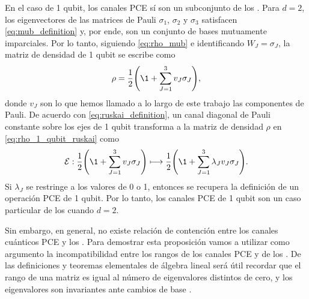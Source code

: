 En el caso de 1 qubit, los canales PCE sí son un subconjunto de los \ruskai{}. Para $d=2$,
los eigenvectores de las matrices de Pauli $\sigma_1$, $\sigma_2$ y $\sigma_3$ 
satisfacen \eqref{eq:mub_definition} y, por ende, son un conjunto 
de bases mutuamente imparciales. Por lo tanto, siguiendo \eqref{eq:rho_mub}
e identificando $W_J=\sigma_J$, la matriz de densidad de 1 qubit se escribe como
\begin{align} \label{eq:rho_1_qubit_ruskai}
	\rho=\frac{1}{2}\qty(\1+\sum_{J=1}^3v_J\sigma_J),
\end{align}
donde $v_J$ son lo que hemos llamado a lo largo de este trabajo 
las componentes de Pauli.
De acuerdo con \eqref{eq:ruskai_definition}, 
un canal diagonal de Pauli constante sobre los ejes de 1 qubit transforma 
a la matriz de densidad $\rho$ en \eqref{eq:rho_1_qubit_ruskai} como
\begin{align}
	\E :  \frac{1}{2}\qty(\1+\sum_{J=1}^3v_J\sigma_J)
	\longmapsto 
	\frac{1}{2}\qty(\1+\sum_{J=1}^3\lambda_J v_J\sigma_J).
\end{align}
Si $\lambda_J$ se restringe a los valores de 0 o 1, entonces se recupera 
la definición de un operación PCE de 1 qubit. Por lo tanto, los canales PCE 
de 1 qubit son un caso particular de los \ruskai{} cuando $d=2$.

Sin embargo, en general, no existe relación de contención entre los canales cuánticos PCE 
y los \ruskai{}. Para demostrar esta proposición vamos a utilizar como 
argumento la incompatibilidad entre los rangos de los canales PCE
y de los \ruskai{}. 
De las definiciones y teoremas elementales de álgebra lineal será útil 
recordar que el rango de 
una matriz es igual al número de eigenvalores distintos de cero, y los eigenvalores
son invariantes ante cambios de base \cite{axler1997linear,lang2012introduction}. 

